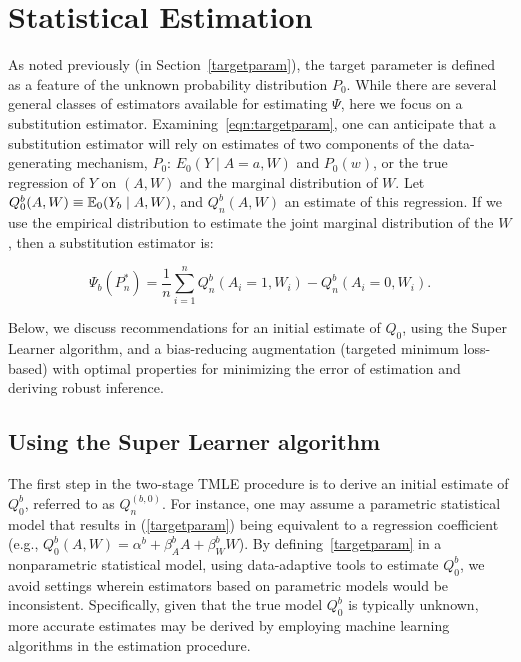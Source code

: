 \section{Statistical Estimation}\label{estimation}

As noted previously (in Section~\ref{targetparam}), the target parameter is
defined as a feature of the unknown probability distribution $P_{0}$. While
there are several general classes of estimators available for estimating
$\Psi$, here we focus on a substitution estimator.
Examining~\ref{eqn:targetparam}, one can anticipate that a substitution
estimator will rely on estimates of two components of the data-generating
mechanism, $P_0$: $E_0 (Y \mid A = a, W)$ and $P_0(w)$, or the true regression
of $Y$ on $(A, W)$ and the marginal distribution of $W$. Let
$Q^{b}_{0}(A, W) \equiv \mathbb{E}_{0}(Y_{b} \mid A, W)$, and $Q^{b}_{n}(A, W)$ an
estimate of this regression. If we use the empirical distribution to estimate
the joint marginal distribution of the $W$, then a substitution estimator is:

\begin{equation}
\label{subest}
  \Psi_b(P_{n}^{*}) = \frac{1}{n}\sum_{i = 1}^{n} Q^{b}_{n}(A_i = 1, W_{i}) -
  Q^{b}_{n}(A_i = 0, W_{i}).
\end{equation}

Below, we discuss recommendations for an initial estimate of $Q_0$, using the
Super Learner algorithm, and a bias-reducing augmentation (targeted minimum
loss-based) with optimal properties for minimizing the error of estimation and
deriving robust inference.

\subsection{Using the Super Learner algorithm}\label{superlearner}

The first step in the two-stage TMLE procedure is to derive an initial estimate
of $Q^{b}_{0}$, referred to as $Q^{(b, 0)}_{n}$. For instance, one may assume
a parametric statistical model that results in (\ref{targetparam}) being
equivalent to a regression coefficient (e.g., $Q^{b}_{0}(A, W) = \alpha^{b} +
\beta^{b}_{A}A + \beta^{b}_{W}W$). By defining~\ref{targetparam} in a
nonparametric statistical model, using data-adaptive tools to estimate
$Q^{b}_{0}$, we avoid settings wherein estimators based on parametric models
would be inconsistent. Specifically, given that the true model $Q^{b}_{0}$ is
typically unknown, more accurate estimates may be derived by employing machine
learning algorithms in the estimation procedure.

